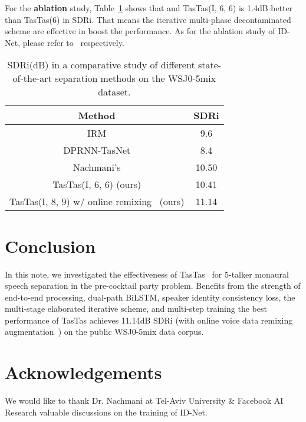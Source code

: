 \documentclass{article}
\numberwithin{equation}{section}
\theoremstyle{remark}
\begin{document}
For the  \textbf{ablation} study,  Table~\ref{tab:sdri} shows that
 and TasTas(I, 6, 6) is 1.4dB better than TasTas(6) in SDRi. That means the 
iterative multi-phase decontaminated scheme are
effective in boost the performance. As for the ablation study of ID-Net, 
please refer to~\cite{shi2020speech}  respectively.



\begin{table}[th]
  \caption[sdri]{SDRi(dB) in a comparative study of different state-of-the-art
    separation methods on the WSJ0-5mix dataset.}\label{tab:sdri}
  \centering
  \begin{tabular}{c|c}
    \hline
    \hline
    Method                & SDRi  \\
    \hline
    \hline
    IRM                   & 9.6   \\
    DPRNN-TasNet          & 8.4   \\
    Nachmani's            & 10.50  \\
    \hline
    \hline
    TasTas(I, 6, 6)  (ours) & 10.41  \\
    TasTas(I, 8, 9) w/ online remixing~\cite{zeghidour2020wavesplit}  (ours) & 11.14  \\
    \hline
  \end{tabular}
\end{table}

\section{Conclusion}
\label{sec:conclusion}

In this note, we investigated the effectiveness of TasTas~\cite{shi2020speech} 
for 5-talker
monaural speech separation in the pre-cocktail party problem. 
 Benefits from the strength of
end-to-end processing, dual-path BiLSTM, speaker identity consistency loss, 
the multi-stage elaborated iterative scheme, and multi-step training
the best performance of  TasTas achieves 11.14dB SDRi (with 
online voice data remixing augmentation~\cite{zeghidour2020wavesplit}) on the public WSJ0-5mix data corpus.


\section{Acknowledgements}
We would like to thank Dr. Nachmani at Tel-Aviv University \& Facebook AI Research valuable 
discussions on the training of ID-Net.




\end{document}
